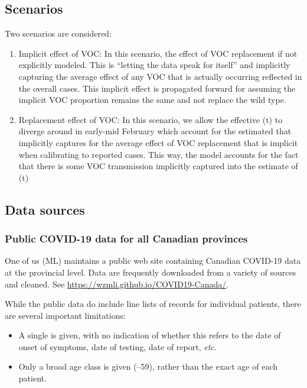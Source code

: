 \documentclass[12pt]{article}\usepackage[]{graphicx}\usepackage[]{color}
\begin{document}
\subsection*{Scenarios}

Two scenarios are considered:

\begin{enumerate}
\item{Implicit effect of VOC: In this scenario, the effect of VOC replacement if not explicitly modeled. This is ``letting the data speak for itself'' and implicitly capturing the average effect of any VOC that is actually occurring reflected in the overall cases. This implicit effect is propagated forward for assuming the implicit VOC proportion remains the same and not replace the wild type.}
\item{Replacement effect of VOC: In this scenario, we allow the effective \B(t) to diverge around in early-mid February which account for the estimated \B that implicitly captures for the average effect of VOC replacement that is implicit when calibrating to reported cases. This way, the model accounts for the fact that there is some VOC transmission implicitly captured into the estimate of \B(t)}
\end{enumerate}

\subsection{Data sources}


\subsubsection*{Public COVID-19 data for all Canadian provinces}

One of us (ML) maintains a public web site containing Canadian
COVID-19 data at the provincial level.  Data are frequently downloaded
from a variety of sources and cleaned.  See
\url{https://wzmli.github.io/COVID19-Canada/}.

While the public data do include line lists of records for individual
patients, there are several important limitations: 
\begin{itemize}
\item A single  is given, with no indication of
  whether this refers to the date of onset of symptoms, date of
  testing, date of report, \emph{etc.}
\item Only a broad age class is given (--59), rather than the
  exact age of each patient.
\end{itemize}
\end{document}
